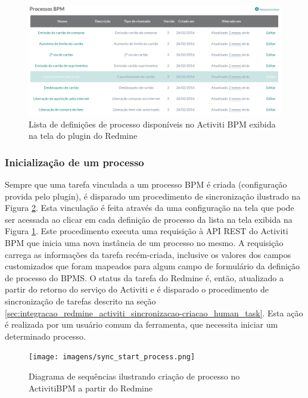 \begin{figure}[H]
\centering
\includegraphics[width=1\textwidth]{imagens/plugin_process_list.png}
\caption{Lista de definições de processo disponíveis no Activiti BPM exibida na tela do plugin do Redmine}
\label{fig:process_list}
\end{figure}

\subsubsection{Inicialização de um processo}\label{sec:integracao_redmine_activiti_sincronizacao-inicializacao_processo}

Sempre que uma tarefa vinculada a um processo BPM é criada (configuração provida pelo plugin), é disparado um procedimento de sincronização ilustrado na Figura \ref{fig:start_process_diagram}. Esta vinculação é feita através da uma configuração na tela que pode ser acessada ao clicar em cada definição de processo da lista na tela exibida na Figura \ref{fig:process_list}. Este procedimento executa uma requisição à API REST do Activiti BPM que inicia uma nova instância de um processo no mesmo. A requisição carrega as informações da tarefa recém-criada, inclusive os valores dos campos customizados que foram mapeados para algum campo de formulário da definição de processo do BPMS. O status da tarefa do Redmine é, então, atualizado a partir do retorno do serviço do Activiti e é disparado o procedimento de sincronização de tarefas descrito na seção \ref{sec:integracao_redmine_activiti_sincronizacao-criacao_human_task}. Esta ação é realizada por um usuário comum da ferramenta, que necessita iniciar um determinado processo.

\begin{figure}[H]
\centering
\texttt{[image: imagens/sync\_start\_process.png]}
\caption{Diagrama de sequências ilustrando criação de processo no ActivitiBPM a partir do Redmine}
\label{fig:start_process_diagram}
\end{figure}


